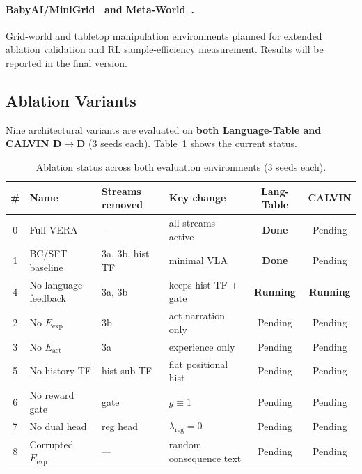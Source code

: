 \documentclass{article}
\renewcommand{\arraystretch}{1.25}
\newcommand{\modelname}{\textsc{VERA}\xspace}
\newcommand{\Lact}{$E_{\mathrm{act}}$\xspace}
\newcommand{\Lexp}{$E_{\mathrm{exp}}$\xspace}
\begin{document}
\paragraph{BabyAI/MiniGrid~\citep{chevalier2019babyai,minigrid} and
Meta-World~\citep{yu2020metaworld}.}
Grid-world and tabletop manipulation environments planned for extended
ablation validation and RL sample-efficiency measurement.
Results will be reported in the final version.

\subsection{Ablation Variants}
\label{sec:ablation_status}

Nine architectural variants are evaluated on \textbf{both Language-Table and
CALVIN D$\to$D} (3 seeds each).
Table~\ref{tab:ablation_status} shows the current status.

\begin{table}[h]
\centering
\caption{Ablation status across both evaluation environments (3 seeds each).}
\label{tab:ablation_status}
\small
\renewcommand{\arraystretch}{1.15}
\begin{tabular}{clllcc}
\toprule
\textbf{\#} & \textbf{Name} & \textbf{Streams removed} & \textbf{Key change}
            & \textbf{Lang-Table} & \textbf{CALVIN} \\
\midrule
0 & Full \modelname        & —                  & all streams active    & \textbf{Done} & Pending \\
1 & BC/SFT baseline        & 3a, 3b, hist TF    & minimal VLA           & \textbf{Done} & Pending \\
4 & No language feedback   & 3a, 3b             & keeps hist TF + gate  & \textbf{Running} & \textbf{Running} \\
2 & No \Lexp               & 3b                 & act narration only    & Pending & Pending \\
3 & No \Lact               & 3a                 & experience only       & Pending & Pending \\
5 & No history TF          & hist sub-TF        & flat positional hist  & Pending & Pending \\
6 & No reward gate         & gate               & $g\!\equiv\!1$        & Pending & Pending \\
7 & No dual head           & reg head           & $\lambda_\mathrm{reg}{=}0$ & Pending & Pending \\
8 & Corrupted \Lexp        & —                  & random consequence text & Pending & Pending \\
\bottomrule
\end{tabular}
\end{table}
\end{document}
